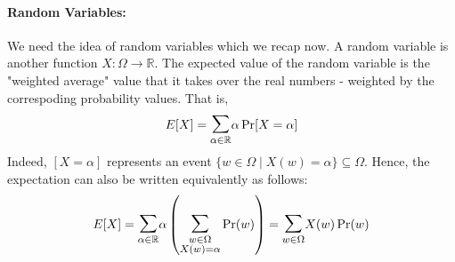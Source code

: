 \paragraph*{Random Variables:}
We need the idea of random variables which we recap now. A random variable is another function $X : \Omega \to \mathbb{R}$. The expected value of the random variable is the "weighted average" value that it takes over the real numbers - weighted by the correspoding probability values. That is, 
$$ E[X] = \bigsum_{\alpha \in \mathbb{R}} \alpha \Pr[X = \alpha]$$
Indeed, $[X = \alpha]$ represents an event $\{ w \in \Omega \mid X(w) = \alpha \} \subseteq \Omega$. Hence, the expectation can also be written equivalently as follows:
$$E[X] = \bigsum_{\alpha \in \mathbb{R}} \alpha \left( \bigsum_{\substack{w \in \Omega \\ X(w) = \alpha}} \Pr(w) \right)  = \bigsum_{w \in \Omega} X(w)\Pr(w)$$

